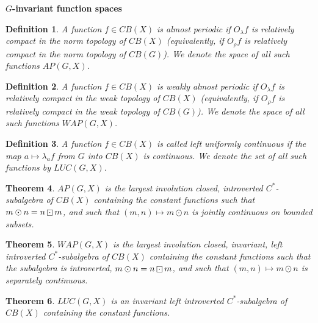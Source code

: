 \documentclass[landscape]{slides}
\newtheorem{defn}{Definition}
\newtheorem{theorem}[defn]{Theorem}
\begin{document}
\begin{slide}
\bf{$G$-invariant function spaces}\\
\begin{defn}
A function $f\in CB(X)$ is {\it almost periodic} 
if $O_\lambda f$ is relatively compact in the norm topology of $CB(X)$
(equivalently, if $O_\rho f$ is relatively compact in the norm topology
of $CB(G)$).  We
denote the space of all such functions $AP(G,X)$.\\
\end{defn}


\begin{defn}
A function $f\in CB(X)$ is {\it weakly almost periodic} 
if $O_\lambda f$ is relatively compact in the weak topology of $CB(X)$
(equivalently, if $O_\rho f$ is relatively compact in the weak topology
of $CB(G)$).  We
denote the space of all such functions $WAP(G,X)$.\\
\end{defn}


\begin{defn}
A function $f\in CB(X)$ is called {\it left uniformly continuous} if the
map $a\mapsto\lambda_a f$ from $G$ into $CB(X)$ is continuous.
We denote the set of all such functions by $LUC(G,X)$.
\end{defn}
\end{slide}

\begin{slide}
\begin{theorem}
$AP(G,X)$ is the largest involution closed, introverted $C^*$-subalgebra of $CB(X)$
containing the constant functions such that $m\odot n = n\dotbox m$, and such that
$(m,n)\mapsto m\odot n$ is jointly continuous on bounded subsets.\\
\end{theorem}

\begin{theorem}
$WAP(G,X)$ is the largest involution closed, invariant, left introverted $C^*$-subalgebra of $CB(X)$
containing the constant functions such that the subalgebra is introverted, $m\odot n = n\dotbox m$, and such that
$(m,n)\mapsto m\odot n$ is separately continuous.\\
\end{theorem}

\begin{theorem}
$LUC(G,X)$ is an invariant left introverted $C^*$-subalgebra of $CB(X)$ containing the constant
functions.
\end{theorem}
\end{slide}
\end{document}
